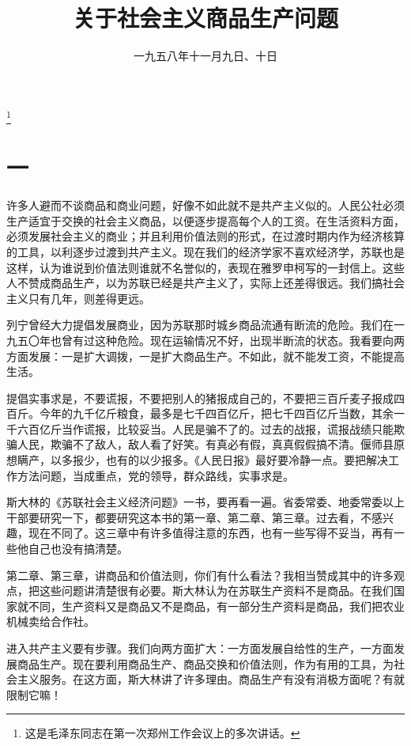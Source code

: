 
\title{关于社会主义商品生产问题}
\date{一九五八年十一月九日、十日}
\thanks{这是毛泽东同志在第一次郑州工作会议上的多次讲话。}
\maketitle


\section*{一}

许多人避而不谈商品和商业问题，好像不如此就不是共产主义似的。人民公社必须生产适宜于交换的社会主义商品，以便逐步提高每个人的工资。在生活资料方面，必须发展社会主义的商业；并且利用价值法则的形式，在过渡时期内作为经济核算的工具，以利逐步过渡到共产主义。现在我们的经济学家不喜欢经济学，苏联也是这样，认为谁说到价值法则谁就不名誉似的，表现在雅罗申柯写的一封信上。这些人不赞成商品生产，以为苏联已经是共产主义了，实际上还差得很远。我们搞社会主义只有几年，则差得更远。

列宁曾经大力提倡发展商业，因为苏联那时城乡商品流通有断流的危险。我们在一九五〇年也曾有过这种危险。现在运输情况不好，出现半断流的状态。我看要向两方面发展：一是扩大调拨，一是扩大商品生产。不如此，就不能发工资，不能提高生活。

提倡实事求是，不要谎报，不要把别人的猪报成自己的，不要把三百斤麦子报成四百斤。今年的九千亿斤粮食，最多是七千四百亿斤，把七千四百亿斤当数，其余一千六百亿斤当作谎报，比较妥当。人民是骗不了的。过去的战报，谎报战绩只能欺骗人民，欺骗不了敌人，敌人看了好笑。有真必有假，真真假假搞不清。偃师县原想瞒产，以多报少，也有的以少报多。《人民日报》最好要冷静一点。要把解决工作方法问题，当成重点，党的领导，群众路线，实事求是。

斯大林的《苏联社会主义经济问题》一书，要再看一遍。省委常委、地委常委以上干部要研究一下，都要研究这本书的第一章、第二章、第三章。过去看，不感兴趣，现在不同了。这三章中有许多值得注意的东西，也有一些写得不妥当，再有一些他自己也没有搞清楚。

第二章、第三章，讲商品和价值法则，你们有什么看法？我相当赞成其中的许多观点，把这些问题讲清楚很有必要。斯大林认为在苏联生产资料不是商品。在我们国家就不同，生产资料又是商品又不是商品，有一部分生产资料是商品，我们把农业机械卖给合作社。

进入共产主义要有步骤。我们向两方面扩大：一方面发展自给性的生产，一方面发展商品生产。现在要利用商品生产、商品交换和价值法则，作为有用的工具，为社会主义服务。在这方面，斯大林讲了许多理由。商品生产有没有消极方面呢？有就限制它嘛！

